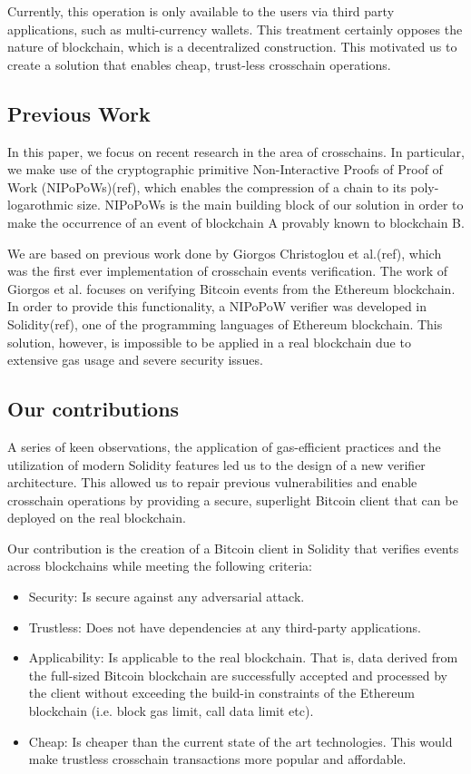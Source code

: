 Currently, this operation is only available to the users via third party
applications, such as multi-currency wallets. This treatment certainly
opposes the nature of blockchain, which is a decentralized construction.
This motivated us to create a solution that enables cheap, trust-less
crosschain operations.

\subsection{Previous Work}

In this paper, we focus on recent research in the area of crosschains.
In particular, we make use of the cryptographic primitive
Non-Interactive Proofs of Proof of Work (NIPoPoWs)(ref), which enables
the compression of a chain to its poly-logarothmic size. NIPoPoWs is the
main building block of our solution in order to make the occurrence of
an event of blockchain A provably known to blockchain B.

We are based on previous work done by Giorgos Christoglou et al.(ref),
which was the first ever implementation of crosschain events
verification. The work of Giorgos et al. focuses on verifying Bitcoin
events from the Ethereum blockchain. In order to provide this
functionality, a NIPoPoW verifier was developed in Solidity(ref), one of
the programming languages of Ethereum blockchain. This solution,
however, is impossible to be applied in a real blockchain due to
extensive gas usage and severe security issues.

\subsection{Our contributions}

A series of keen observations, the application of gas-efficient
practices and the utilization of modern Solidity features led us to the
design of a new verifier architecture. This allowed us to repair
previous vulnerabilities and enable crosschain operations by providing a
secure, superlight Bitcoin client that can be deployed on the real
blockchain.

Our contribution is the creation of a Bitcoin client in Solidity that
verifies events across blockchains while meeting the following criteria:
\begin{itemize}
    \item
        Security: Is secure against any adversarial attack.
    \item
        Trustless: Does not have dependencies at any third-party applications.
    \item
        Applicability: Is applicable to the real blockchain. That is, data
        derived from the full-sized Bitcoin blockchain are successfully
        accepted and processed by the client without exceeding the build-in
        constraints of the Ethereum blockchain (i.e. block gas limit, call
        data limit etc).
    \item
        Cheap: Is cheaper than the current state of the art technologies. This
        would make trustless crosschain transactions more popular and
        affordable.
\end{itemize}

\pagebreak
